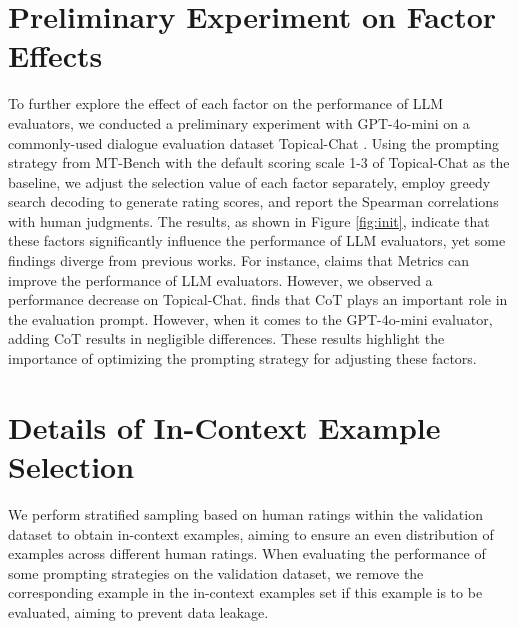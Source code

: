 \section{Preliminary Experiment on Factor Effects}
\label{appendix:preliminary_experiment}
To further explore the effect of each factor on the performance of LLM evaluators, we conducted a preliminary experiment with GPT-4o-mini on a commonly-used dialogue evaluation dataset Topical-Chat \cite{gopalakrishnan2019topical}. 
Using the prompting strategy from MT-Bench \cite{zheng2023judging} with the default scoring scale 1-3 of Topical-Chat as the baseline, we adjust the selection value of each factor separately, employ greedy search decoding  
to generate rating scores, and report the Spearman correlations with human judgments.
The results, as shown in Figure \ref{fig:init}, indicate that these factors significantly influence the performance of LLM evaluators, yet some findings diverge from previous works. 
For instance, \citet{pereira2024check} claims that Metrics can improve the performance of LLM evaluators. 
However, we observed a performance decrease on Topical-Chat. 
\citet{chiang-lee-2023-closer} finds that CoT plays an important role in the evaluation prompt. 
However, when it comes to the GPT-4o-mini evaluator, adding CoT results in negligible differences.
These results highlight the importance of optimizing the prompting strategy for adjusting these factors. 

\section{Details of In-Context Example Selection}
\label{appendix:in_context_example}
We perform stratified sampling based on human ratings within the validation dataset to obtain in-context examples, aiming to ensure an even distribution of examples across different human ratings. 
When evaluating the performance of some prompting strategies on the validation dataset, we remove the corresponding example in the in-context examples set if this example is to be evaluated, aiming to prevent data leakage.


